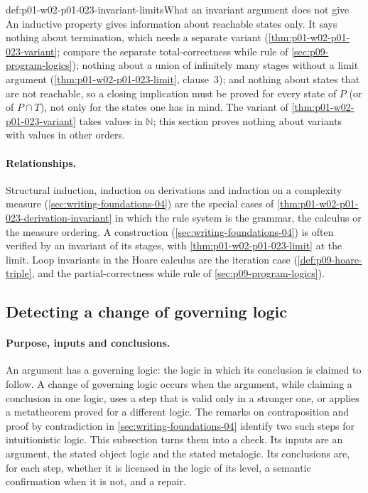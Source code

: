 \begin{hbwarning}{def:p01-w02-p01-023-invariant-limits}{What an invariant argument does not give}
An inductive property gives information about reachable states only. It
says nothing about termination, which needs a separate variant
(\cref{thm:p01-w02-p01-023-variant}; compare the separate total-correctness
while rule of \cref{sec:p09-program-logics}); nothing about a union of infinitely
many stages without a limit argument (\cref{thm:p01-w02-p01-023-limit},
clause~3); and nothing about states that are not reachable, so a closing
implication must be proved for every state of \(P\) (or of \(P\cap T\)),
not only for the states one has in mind. The variant of
\cref{thm:p01-w02-p01-023-variant} takes values in \(\mathbb N\); this
section proves nothing about variants with values in other orders.
\end{hbwarning}

\paragraph{Relationships.}
Structural induction, induction on derivations and induction on a complexity
measure (\cref{sec:writing-foundations-04}) are the special cases of
\cref{thm:p01-w02-p01-023-derivation-invariant} in which the rule system is
the grammar, the calculus or the measure ordering. A construction
(\cref{sec:writing-foundations-04}) is often verified by an invariant of its
stages, with \cref{thm:p01-w02-p01-023-limit} at the limit. Loop invariants
in the Hoare calculus are the iteration case
(\cref{def:p09-hoare-triple}, and the partial-correctness while rule of
\cref{sec:p09-program-logics}).

\subsection{Detecting a change of governing logic}
\label{sec:p01-w02-p01-023-governing-logic}

\paragraph{Purpose, inputs and conclusions.}
An argument has a governing logic: the logic in which its conclusion is
claimed to follow. A change of governing logic occurs when the argument,
while claiming a conclusion in one logic, uses a step that is valid only in
a stronger one, or applies a metatheorem proved for a different logic. The
remarks on contraposition and proof by contradiction in
\cref{sec:writing-foundations-04} identify two such steps for
intuitionistic logic. This subsection turns them into a check. Its inputs are
an argument, the stated object logic and the stated metalogic. Its
conclusions are, for each step, whether it is licensed in the logic of its
level, a semantic confirmation when it is not, and a repair.

